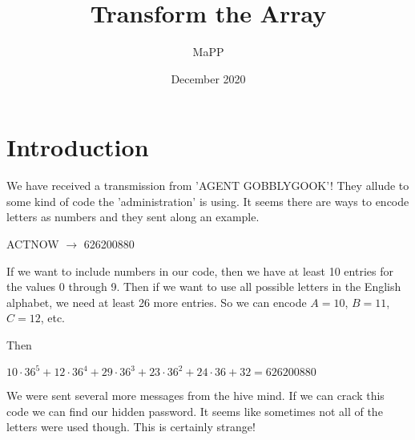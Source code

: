 \documentclass{article}
\title{Transform the Array}
\author{MaPP}
\date{December 2020}
\begin{document}
\maketitle

\section{Introduction}
We have received a transmission from 'AGENT GOBBLYGOOK'! They allude to some kind of code the 'administration' is using. It seems there are ways to encode letters as numbers and they sent along an example.

ACTNOW $\to$ 626200880

If we want to include numbers in our code, then we have at least 10 entries for the values 0 through 9. Then if we want to use all possible letters in the English alphabet, we need at least 26 more entries. So we can encode $A=10$, $B=11$, $C=12$, etc. 

Then 
\begin{center}
$10\cdot36^5+12\cdot36^4+29\cdot36^3+23\cdot36^2+24\cdot36+32 = 626200880$
\end{center}

We were sent several more messages from the hive mind. If we can crack this code we can find our hidden password. It seems like sometimes not all of the letters were used though. This is certainly strange!
\newpage
\end{document}
